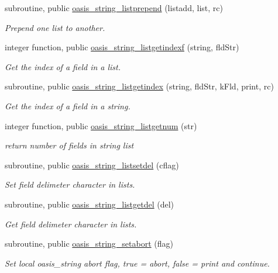 \begin{DoxyCompactItemize}
subroutine, public \hyperlink{namespacemod__oasis__string_a7df42cce90ae7fa5eceb0b9f2e4bf169}{oasis\+\_\+string\+\_\+listprepend} (listadd, list, rc)
\begin{DoxyCompactList}\small\item\em Prepend one list to another. \end{DoxyCompactList}\item 
integer function, public \hyperlink{namespacemod__oasis__string_a66bedb9c90f129c44087bf3f3c26bdb7}{oasis\+\_\+string\+\_\+listgetindexf} (string, fld\+Str)
\begin{DoxyCompactList}\small\item\em Get the index of a field in a list. \end{DoxyCompactList}\item 
subroutine, public \hyperlink{namespacemod__oasis__string_a6e2bf29a9030f16e3a58d0302ab793f2}{oasis\+\_\+string\+\_\+listgetindex} (string, fld\+Str, k\+Fld, print, rc)
\begin{DoxyCompactList}\small\item\em Get the index of a field in a string. \end{DoxyCompactList}\item 
integer function, public \hyperlink{namespacemod__oasis__string_a15a49e6a71df520424402a753be10bb1}{oasis\+\_\+string\+\_\+listgetnum} (str)
\begin{DoxyCompactList}\small\item\em return number of fields in string list \end{DoxyCompactList}\item 
subroutine, public \hyperlink{namespacemod__oasis__string_a4229e0726d97fc10f17027caea332daf}{oasis\+\_\+string\+\_\+listsetdel} (cflag)
\begin{DoxyCompactList}\small\item\em Set field delimeter character in lists. \end{DoxyCompactList}\item 
subroutine, public \hyperlink{namespacemod__oasis__string_a0ed07993c2e7d09baffe933c6075f154}{oasis\+\_\+string\+\_\+listgetdel} (del)
\begin{DoxyCompactList}\small\item\em Get field delimeter character in lists. \end{DoxyCompactList}\item 
subroutine, public \hyperlink{namespacemod__oasis__string_a10977c4902f912074ef3effd86630a24}{oasis\+\_\+string\+\_\+setabort} (flag)
\begin{DoxyCompactList}\small\item\em Set local oasis\+\_\+string abort flag, true = abort, false = print and continue. \end{DoxyCompactList}\item 

\end{DoxyCompactItemize}
